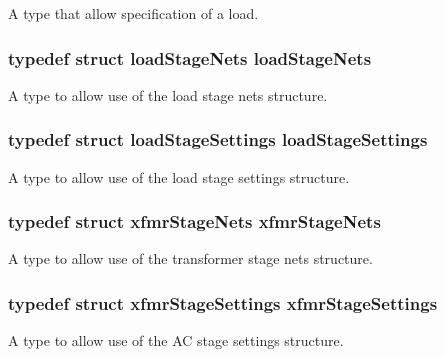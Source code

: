 A type that allow specification of a load. \hypertarget{a00027_aae981f2f918bbbfae4517a68d60ffb45}{
\subsubsection[{load\-Stage\-Nets}]{\setlength{\rightskip}{0pt plus 5cm}typedef struct {\bf load\-Stage\-Nets} {\bf load\-Stage\-Nets}}}\label{a00027_aae981f2f918bbbfae4517a68d60ffb45}
A type to allow use of the load stage nets structure. \hypertarget{a00027_a23ea7275d3010efb32f35ffe237401ff}{
\subsubsection[{load\-Stage\-Settings}]{\setlength{\rightskip}{0pt plus 5cm}typedef struct {\bf load\-Stage\-Settings} {\bf load\-Stage\-Settings}}}\label{a00027_a23ea7275d3010efb32f35ffe237401ff}
A type to allow use of the load stage settings structure. \hypertarget{a00027_a583225b973f6b7cb16edbff4d3dadeab}{
\subsubsection[{xfmr\-Stage\-Nets}]{\setlength{\rightskip}{0pt plus 5cm}typedef struct {\bf xfmr\-Stage\-Nets} {\bf xfmr\-Stage\-Nets}}}\label{a00027_a583225b973f6b7cb16edbff4d3dadeab}
A type to allow use of the transformer stage nets structure. \hypertarget{a00027_ab13cb1eb6c11d220d249e98a5250235a}{
\subsubsection[{xfmr\-Stage\-Settings}]{\setlength{\rightskip}{0pt plus 5cm}typedef struct {\bf xfmr\-Stage\-Settings} {\bf xfmr\-Stage\-Settings}}}\label{a00027_ab13cb1eb6c11d220d249e98a5250235a}
A type to allow use of the A\-C stage settings structure. 

